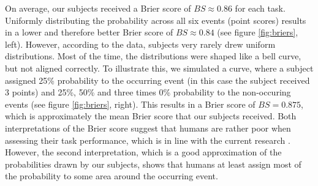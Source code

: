\documentclass[../main/main.tex]{subfiles}
\begin{document}
	On average, our subjects received a Brier score of $BS \approx 0.86$ for each task. Uniformly distributing the probability across all six events (point scores) results in a lower and therefore better Brier score of $BS \approx 0.84$ (see figure \ref{fig:briers}, left). However, according to the data, subjects very rarely drew uniform distributions. Most of the time, the distributions were shaped like a bell curve, but not aligned correctly. To illustrate this, we simulated a curve, where a subject assigned 25\% probability to the occurring event (in this case the subject received 3 points) and 25\%, 50\% and three times 0\% probability to the non-occuring events (see figure \ref{fig:briers}, right). This results in a Brier score of $BS = 0.875$, which is approximately the mean Brier score that our subjects received. Both interpretations of the Brier score suggest that humans are rather poor when assessing their task performance, which is in line with the current research \citep{raaijmakers2019effects, sedikides1993assessment}. However, the second interpretation, which is a good approximation of the probabilities drawn by our subjects, shows that humans at least assign most of the probability to some area around the occurring event.
	
\end{document}
